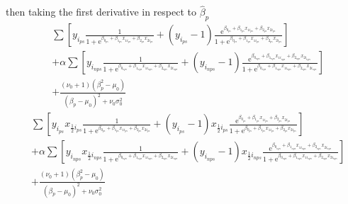 \documentclass[10.5pt]{article}
\begin{document}
then taking the first derivative in respect to \( \hat{\beta}_p \)
\begin{equation}
    \begin{split}
        &\sum \left[ y_{i_{ps}} \frac{1}{1+\mathrm{e}^{\beta_{0_{ps}} + \beta_{1_{ps}} x_{1i_{ps}} + \beta_{2_{ps}} x_{2i_{ps}}}} 
        + (y_{i_{ps}} - 1) \frac{\mathrm{e}^{\beta_{0_{ps}} + \beta_{1_{ps}} x_{1i_{ps}} + \beta_{2_{ps}} x_{2i_{ps}}}}{1+\mathrm{e}^{\beta_{0_{ps}} + \beta_{1_{ps}} x_{1i_{ps}} + \beta_{2_{ps}} x_{2i_{ps}}}} \right] \\
        &+ \alpha \sum \left[ y_{i_{nps}} \frac{1}{1+\mathrm{e}^{\beta_{0_{nps}} + \beta_{1_{nps}} x_{1i_{nps}} + \beta_{2_{nps}} x_{2i_{nps}}}} 
        + (y_{i_{nps}} - 1) \frac{\mathrm{e}^{\beta_{0_{nps}} + \beta_{1_{nps}} x_{1i_{nps}} + \beta_{2_{nps}} x_{2i_{nps}}}}{1+\mathrm{e}^{\beta_{0_{nps}} + \beta_{1_{nps}} x_{1i_{nps}} + \beta_{2_{nps}} x_{2i_{nps}}}} \right] \\
        &+ \frac{(\nu_0 + 1) (\beta_p^2 - \mu_0)}{(\beta_p - \mu_0)^2 + \nu_0 \sigma_0^2}
    \end{split}
\end{equation}
\begin{equation}
    \begin{split}
        &\sum \left[ y_{i_{ps}} x_{\frac{1}{2}i_{ps}} \frac{1}{1+\mathrm{e}^{\beta_{0_{ps}} + \beta_{1_{ps}} x_{1i_{ps}} + \beta_{2_{ps}} x_{2i_{ps}}}} 
        + (y_{i_{ps}} - 1) x_{\frac{1}{2}i_{ps}} \frac{\mathrm{e}^{\beta_{0_{ps}} + \beta_{1_{ps}} x_{1i_{ps}} + \beta_{2_{ps}} x_{2i_{ps}}}}{1+\mathrm{e}^{\beta_{0_{ps}} + \beta_{1_{ps}} x_{1i_{ps}} + \beta_{2_{ps}} x_{2i_{ps}}}} \right] \\
        &+ \alpha \sum \left[ y_{i_{nps}} x_{\frac{1}{2}i_{nps}} \frac{1}{1+\mathrm{e}^{\beta_{0_{nps}} + \beta_{1_{nps}} x_{1i_{nps}} + \beta_{2_{nps}} x_{2i_{nps}}}} 
        + (y_{i_{nps}} - 1) x_{\frac{1}{2}i_{nps}} \frac{\mathrm{e}^{\beta_{0_{nps}} + \beta_{1_{nps}} x_{1i_{nps}} + \beta_{2_{nps}} x_{2i_{nps}}}}{1+\mathrm{e}^{\beta_{0_{nps}} + \beta_{1_{nps}} x_{1i_{nps}} + \beta_{2_{nps}} x_{2i_{nps}}}} \right] \\
        &+ \frac{(\nu_0 + 1) (\beta_p^2 - \mu_0)}{(\beta_p - \mu_0)^2 + \nu_0 \sigma_0^2}
    \end{split}
\end{equation}
\end{document}
